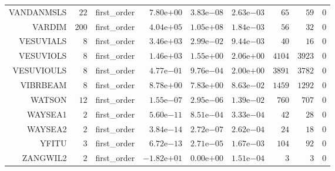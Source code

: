 \begin{longtable}{rrrrrrrrr}
VANDANMSLS & \(    22\) & first\_order & \( 7.80\)e\(+00\) & \( 3.83\)e\(-08\) & \( 2.63\)e\(-03\) & \(    65\) & \(    59\) & \(     0\) \\
VARDIM & \(   200\) & first\_order & \( 4.04\)e\(+05\) & \( 1.05\)e\(+08\) & \( 1.84\)e\(-03\) & \(    56\) & \(    32\) & \(     0\) \\
VESUVIALS & \(     8\) & first\_order & \( 3.46\)e\(+03\) & \( 2.99\)e\(-02\) & \( 9.44\)e\(-03\) & \(    40\) & \(    16\) & \(     0\) \\
VESUVIOLS & \(     8\) & first\_order & \( 1.46\)e\(+03\) & \( 1.55\)e\(+00\) & \( 2.06\)e\(+00\) & \(  4104\) & \(  3923\) & \(     0\) \\
VESUVIOULS & \(     8\) & first\_order & \( 4.77\)e\(-01\) & \( 9.76\)e\(-04\) & \( 2.00\)e\(+00\) & \(  3891\) & \(  3782\) & \(     0\) \\
VIBRBEAM & \(     8\) & first\_order & \( 8.78\)e\(+00\) & \( 7.83\)e\(+00\) & \( 8.63\)e\(-02\) & \(  1459\) & \(  1292\) & \(     0\) \\
WATSON & \(    12\) & first\_order & \( 1.55\)e\(-07\) & \( 2.95\)e\(-06\) & \( 1.39\)e\(-02\) & \(   760\) & \(   707\) & \(     0\) \\
WAYSEA1 & \(     2\) & first\_order & \( 5.60\)e\(-11\) & \( 8.51\)e\(-04\) & \( 3.33\)e\(-04\) & \(    42\) & \(    28\) & \(     0\) \\
WAYSEA2 & \(     2\) & first\_order & \( 3.84\)e\(-14\) & \( 2.72\)e\(-07\) & \( 2.62\)e\(-04\) & \(    24\) & \(    18\) & \(     0\) \\
YFITU & \(     3\) & first\_order & \( 6.72\)e\(-13\) & \( 2.71\)e\(-05\) & \( 1.67\)e\(-03\) & \(   104\) & \(    92\) & \(     0\) \\
ZANGWIL2 & \(     2\) & first\_order & \(-1.82\)e\(+01\) & \( 0.00\)e\(+00\) & \( 1.51\)e\(-04\) & \(     3\) & \(     3\) & \(     0\) \\\hline
\end{longtable}
